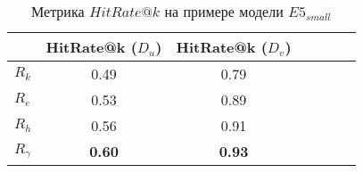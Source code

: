 \begin{table}[ht]
    \centering
    \begin{tabular}{lcccccc}
        \hline
        & \textbf{HitRate@k (\(D_u\))} & \textbf{HitRate@k (\(D_v\))} \\
       \hline
       \(R_k\)      &  0.49&  0.79 \\
       \(R_e\)      &  0.53&  0.89\\
       \(R_h\)      &  0.56&  0.91\\
       \(R_{\gamma}\) &  \textbf{0.60}&  \textbf{0.93}\\
       \hline
       \end{tabular}
    \caption{Метрика $HitRate@k$ на примере модели $E5_{small}$ \cite{e5}}
    \label{tab:hitrate-small}
\end{table}
